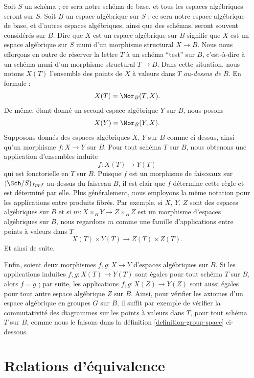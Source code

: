 \noindent
Soit $S$ un schéma ; ce sera notre schéma de base, et tous les espaces algébriques seront sur $S$. Soit $B$ un espace algébrique sur $S$ ; ce sera notre espace algébrique de base, et d'autres espaces algébriques, ainsi que des schémas, seront souvent considérés sur $B$. Dire que $X$ est un espace algébrique sur $B$ signifie que $X$ est un espace algébrique sur $S$ muni d'un morphisme structural $X \to B$. Nous nous efforçons en outre de réserver la lettre $T$ à un schéma ``test'' sur $B$, c'est-à-dire à un schéma muni d'un morphisme structural $T \to B$. Dans cette situation, nous notons $X(T)$ l'ensemble des points de $X$ à valeurs dans $T$ {\it au-dessus de} $B$. En formule :
$$
X(T) = \Mor_B(T, X).
$$
De même, étant donné un second espace algébrique $Y$ sur $B$, nous posons
$$
X(Y) = \Mor_B(Y, X).
$$
Supposons donnés des espaces algébriques $X$, $Y$ sur $B$ comme ci-dessus, ainsi qu'un morphisme $f : X \to Y$ sur $B$. Pour tout schéma $T$ sur $B$, nous obtenons une application d'ensembles induite
$$
f : X(T) \longrightarrow Y(T)
$$
qui est fonctorielle en $T$ sur $B$. Puisque $f$ est un morphisme de faisceaux sur $(\Sch/S)_{fppf}$ au-dessus du faisceau $B$, il est clair que $f$ détermine cette règle et est déterminé par elle. Plus généralement, nous employons la même notation pour les applications entre produits fibrés. Par exemple, si $X$, $Y$, $Z$ sont des espaces algébriques sur $B$ et si $m : X \times_B Y \to Z \times_B Z$ est un morphisme d'espaces algébriques sur $B$, nous regardons $m$ comme une famille d'applications entre points à valeurs dans $T$
$$
X(T) \times Y(T) \longrightarrow Z(T) \times Z(T).
$$
Et ainsi de suite.

\medskip\noindent
Enfin, soient deux morphismes $f, g : X \to Y$ d'espaces algébriques sur $B$. Si les applications induites $f, g : X(T) \to Y(T)$ sont égales pour tout schéma $T$ sur $B$, alors $f = g$ ; par suite, les applications $f, g : X(Z) \to Y(Z)$ sont aussi égales pour tout autre espace algébrique $Z$ sur $B$. Ainsi, pour vérifier les axiomes d'un espace algébrique en groupes $G$ sur $B$, il suffit par exemple de vérifier la commutativité des diagrammes sur les points à valeurs dans $T$, pour tout schéma $T$ sur $B$, comme nous le faisons dans la définition \ref{definition-group-space} ci-dessous.




\section{Relations d'équivalence}
\label{section-equivalence-relations}

